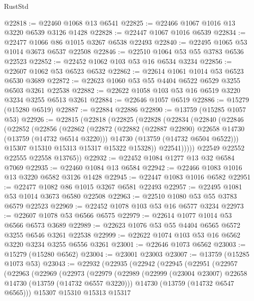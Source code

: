 \begin{lexlean}{RustStd}
\begin{coremodule}
@22818 := @22460 @1068 @13 @6541
@22825 := @22466 @1067 @1016 @13 @3220 @6539 @3126 @1428
@22828 := @22447 @1067 @1016 @6539
@22834 := @22477 @1066 @86 @1015 @3267 @6538 @22493
@22840 := @22495 @1065 @53 @1014 @3673 @6537 @22508
@22846 := @22510 @1064 @53 @55 @3783 @6536 @22523
@22852 := @22452 @1062 @103 @53 @16 @6534 @3234
@22856 := @22607 @1062 @53 @6523 @6532
@22862 := @22614 @1061 @1014 @53 @6523 @6530 @3689
@22872 := @22623 @1060 @53 @55 @4404 @6522 @6529 @3255 @6503 @3261 @22538
@22882 := @22622 @1058 @103 @53 @16 @6519 @3220 @3234 @3255 @6513 @3261
@22884 := @22646 @1057 @6519
@22886 := @15279 (@15280 @6519)
@22887 := @22884 @22886
@22890 := @13759 (@15285 @1057 @53)
@22926 := @22815
    (@22818
      (@22825
        (@22828
          (@22834
            (@22840
              (@22846
                (@22852
                  (@22856
                    (@22862
                      (@22872
                        (@22882 (@22887 @22890) @22658 @14730 (@13759 (@14732 @6514 @3220)))
                        @14730
                        (@13759 (@14732 @6504 @6522)))
                      @15307
                      @15310
                      @15313
                      @15317
                      @15322
                      @15328))
                  @22541)))))
        @22549
        @22552
        @22555
        @22558
        @13765))
@22932 := @22452 @1084 @1277 @13 @32 @6584 @7069
@22935 := @22460 @1084 @13 @6584
@22942 := @22466 @1083 @1016 @13 @3220 @6582 @3126 @1428
@22945 := @22447 @1083 @1016 @6582
@22951 := @22477 @1082 @86 @1015 @3267 @6581 @22493
@22957 := @22495 @1081 @53 @1014 @3673 @6580 @22508
@22963 := @22510 @1080 @53 @55 @3783 @6579 @22523
@22969 := @22452 @1078 @103 @53 @16 @6577 @3234
@22973 := @22607 @1078 @53 @6566 @6575
@22979 := @22614 @1077 @1014 @53 @6566 @6573 @3689
@22989 := @22623 @1076 @53 @55 @4404 @6565 @6572 @3255 @6546 @3261 @22538
@22999 := @22622 @1074 @103 @53 @16 @6562 @3220 @3234 @3255 @6556 @3261
@23001 := @22646 @1073 @6562
@23003 := @15279 (@15280 @6562)
@23004 := @23001 @23003
@23007 := @13759 (@15285 @1073 @53)
@23043 := @22932
    (@22935
      (@22942
        (@22945
          (@22951
            (@22957
              (@22963
                (@22969
                  (@22973
                    (@22979
                      (@22989
                        (@22999 (@23004 @23007) @22658 @14730 (@13759 (@14732 @6557 @3220)))
                        @14730
                        (@13759 (@14732 @6547 @6565)))
                      @15307
                      @15310
                      @15313
                      @15317

\end{coremodule}
\end{lexlean}
